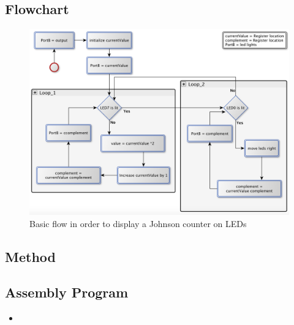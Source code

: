 \documentclass[a4paper, 12pt]{article}
\newcommand{\avrasm}[2]{
\begin{itemize}
\item[]
\end{itemize}
}
\begin{document}
\subsection{Flowchart}
\begin{figure}[h!]
\centering
\includegraphics[scale=0.4]{Flowchart_pics/assignment6_pic.png} 
\caption{Basic flow in order to display a Johnson counter on LEDs}
\label{}
\end{figure}

\subsection{Method}

\newpage

\subsection{Assembly Program}
\avrasm{../src/a6.asm}{}
\end{document}
